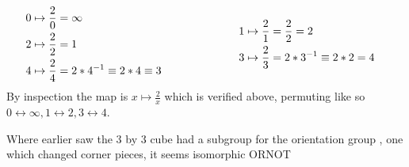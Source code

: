 \documentclass{article}
\begin{document}
\begin{alignat*}{2}
& \begin{aligned}
0 &\mapsto \frac{2}{0} = \infty\\
2 &\mapsto \frac{2}{2} = 1 \\
4 &\mapsto \frac{2}{4} = 2*4^{-1} \equiv 2*4 \equiv 3
\end{aligned}
& \hskip 6em &
\begin{aligned}
1 &\mapsto \frac{2}{1} = \frac{2}{2} = 2\\
3 &\mapsto \frac{2}{3} = 2*3^{-1} \equiv 2*2 = 4
\end{aligned}
\end{alignat*}
By inspection the map is $x \mapsto \frac{2}{x}$ which is verified above, permuting like so $0 \leftrightarrow \infty, 1 \leftrightarrow 2, 3 \leftrightarrow 4$.


Where earlier saw the 3 by 3 cube had a subgroup for the orientation group , one which changed corner pieces, it seems isomorphic ORNOT

\newpage




\end{document}
